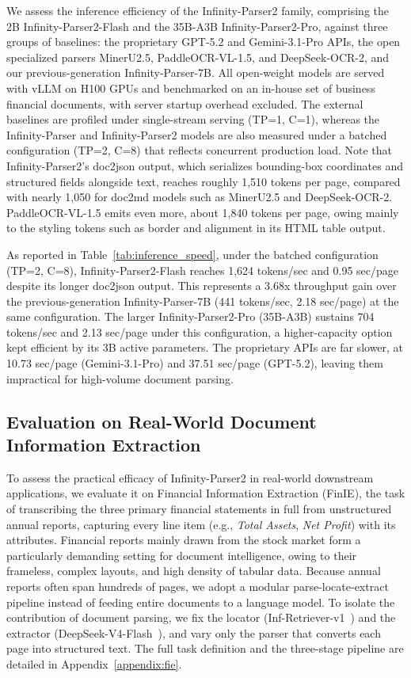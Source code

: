 We assess the inference efficiency of the Infinity-Parser2 family, comprising the 2B Infinity-Parser2-Flash and the 35B-A3B Infinity-Parser2-Pro, against three groups of baselines: the proprietary GPT-5.2 and Gemini-3.1-Pro APIs, the open specialized parsers MinerU2.5, PaddleOCR-VL-1.5, and DeepSeek-OCR-2, and our previous-generation Infinity-Parser-7B. All open-weight models are served with vLLM on H100 GPUs and benchmarked on an in-house set of business financial documents, with server startup overhead excluded. The external baselines are profiled under single-stream serving (TP=1, C=1), whereas the Infinity-Parser and Infinity-Parser2 models are also measured under a batched configuration (TP=2, C=8) that reflects concurrent production load. Note that Infinity-Parser2's doc2json output, which serializes bounding-box coordinates and structured fields alongside text, reaches roughly 1,510 tokens per page, compared with nearly 1,050 for doc2md models such as MinerU2.5 and DeepSeek-OCR-2. PaddleOCR-VL-1.5 emits even more, about 1,840 tokens per page, owing mainly to the styling tokens such as border and alignment in its HTML table output.

As reported in Table~\ref{tab:inference_speed}, under the batched configuration (TP=2, C=8), Infinity-Parser2-Flash reaches 1,624 tokens/sec and 0.95 sec/page despite its longer doc2json output. This represents a 3.68x throughput gain over the previous-generation Infinity-Parser-7B (441 tokens/sec, 2.18 sec/page) at the same configuration. The larger Infinity-Parser2-Pro (35B-A3B) sustains 704 tokens/sec and 2.13 sec/page under this configuration, a higher-capacity option kept efficient by its 3B active parameters. The proprietary APIs are far slower, at 10.73 sec/page (Gemini-3.1-Pro) and 37.51 sec/page (GPT-5.2), leaving them impractical for high-volume document parsing.

\subsection{Evaluation on Real-World Document Information Extraction}

To assess the practical efficacy of Infinity-Parser2 in real-world downstream applications, we evaluate it on Financial Information Extraction (FinIE), the task of transcribing the three primary financial statements in full from unstructured annual reports, capturing every line item (e.g., \textit{Total Assets}, \textit{Net Profit}) with its attributes. Financial reports mainly drawn from the stock market form a particularly demanding setting for document intelligence, owing to their frameless, complex layouts, and high density of tabular data. Because annual reports often span hundreds of pages, we adopt a modular parse-locate-extract pipeline instead of feeding entire documents to a language model. To isolate the contribution of document parsing, we fix the locator (Inf-Retriever-v1~\cite{infly-ai_2025}) and the extractor (DeepSeek-V4-Flash~\cite{deepseekai2026deepseekv4}), and vary only the parser that converts each page into structured text. The full task definition and the three-stage pipeline are detailed in Appendix~\ref{appendix:fie}.

